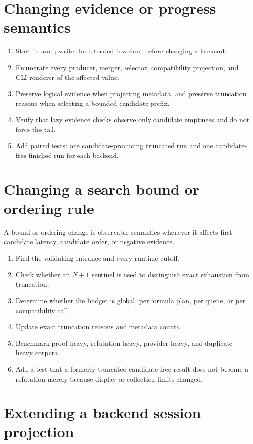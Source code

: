 \documentclass[10pt,letterpaper,oneside]{report}
\newcommand{\code}[1]{\texttt{\detokenize{#1}}}
\begin{document}
\section{Changing evidence or progress semantics}

\begin{enumerate}
  \item Start in \code{Query.hs} and \code{Search.hs}; write the intended invariant before changing a backend.
  \item Enumerate every producer, merger, selector, compatibility projection, and CLI renderer of the affected value.
  \item Preserve logical evidence when projecting metadata, and preserve truncation reasons when selecting a bounded candidate prefix.
  \item Verify that lazy evidence checks observe only candidate emptiness and do not force the tail.
  \item Add paired tests: one candidate-producing truncated run and one candidate-free finished run for each backend.
\end{enumerate}

\section{Changing a search bound or ordering rule}

A bound or ordering change is observable semantics whenever it affects first-candidate latency, candidate order, or negative evidence.

\begin{enumerate}
  \item Find the validating entrance and every runtime cutoff.
  \item Check whether an \(N+1\) sentinel is used to distinguish exact exhaustion from truncation.
  \item Determine whether the budget is global, per formula plan, per queue, or per compatibility call.
  \item Update exact truncation reasons and metadata counts.
  \item Benchmark proof-heavy, refutation-heavy, provider-heavy, and duplicate-heavy corpora.
  \item Add a test that a formerly truncated candidate-free result does not become a refutation merely because display or collection limits changed.
\end{enumerate}

\section{Extending a backend session projection}
\end{document}
